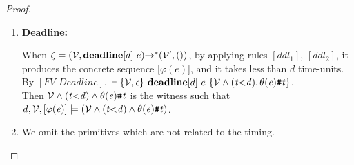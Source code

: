 \documentclass[acmsmall,10pt,review]{acmart}
\newcommand{\env}{\code{\mathcal{V}}}
\newcommand{\es}{\theta}
\newcommand{\anyevent}[1]{{\textcolor{darkred}
{{\textbf{\small #1}}}}}
\newcommand{\code}[1]{{\tt{\ensuremath{\m{#1}}}}}
\newcommand{\codeme}[1]{{\tt{\ensuremath{#1}}}}
\newcommand{\m}{\mathit}
\newcommand{\mysharp}{{\mathrel{\texttt{\#}}}}
\begin{document}
{{{\begin{proof}
\begin{enumerate}
- \code{e_1} started before time limit \code{d}, by applying rules \code{[to_2]}, \code{[to_3]} and \code{[to_1]}, 
it produces the concrete sequence [\anyevent{A}; \code{\varphi(e_1^\prime)}], and \anyevent{A} takes less than \codeme{d} time-units. \\
By \code{[FV\text{-}Timeout]}, $\vdash  \s{\env, \epsilon} \ e_1\ \textbf{timeout}  [d] \ e_2\  
\s{\env \wedge (t{\leq}d), \anyevent{A}\mysharp t \cdot (\es_{e_1^\prime})}$. \\
Then \code{\env \wedge (t{\leq}d) \wedge \anyevent{A}\mysharp t \cdot (\es_{e_1^\prime})} is 
the witness such that \code{d, \env, [\anyevent{A}; \code{\varphi(e_1^\prime)}]  
\models (\env \wedge (t{\leq}d) \wedge \anyevent{A}\mysharp t \cdot (\es_{e_1^\prime})}. 
\\
- \code{e_1} never started, by applying rules \code{[to_4]}, 
it produces the concrete sequence [\code{\varphi(e_2)}], and it takes more than \codeme{d} time-units. \\
By \code{[FV\text{-}Timeout]}, $\vdash  \s{\env, \epsilon} \ e_1\ \textbf{timeout}  [d] \ e_2\  
\s{\env \wedge (t{>}d), (\es_2 \mysharp t)}$. \\
Then \code{\env \wedge (t{>}d) \wedge (\es_2 \mysharp t)} is 
the witness such that \code{d, \env, [\varphi(e_2)]  
\models (\env \wedge (t{>}d) \wedge (\es_2 \mysharp t)}. 



\item \textbf{Deadline:}  

When $\zeta = (\env,  \textbf{deadline}  [d]\ e) {\rightarrow^*} (\env^\prime, ()) $, 
by applying rules \code{[ddl_1]}, \code{[ddl_2]}, 
it produces the concrete sequence [\code{\varphi(e)}], and it takes less than \codeme{d} time-units. \\
By \code{[FV\text{-}Deadline]}, $\vdash  \s{\env, \epsilon} \ \textbf{deadline}[d]\ e 
\ \s{\env \wedge (t{<}d), \es(e)\mysharp t}$. \\
Then \code{\env \wedge (t{<}d) \wedge \es(e)\mysharp t} is the witness such that 
\code{d, \env, [\code{\varphi(e)}]  \models (\env \wedge (t{<}d) \wedge \es(e)\mysharp t)}. \\


\item We omit the primitives which are not related to the timing.  

  \end{enumerate}
   
 \end{proof}
 


}}}
\end{document}
